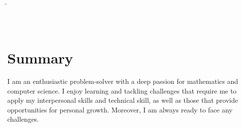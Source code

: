 \documentclass[a4paper, oneside]{article}
\begin{document}
\fontsize{9}{10}\selectfont
\color{default}
\par\smallskip
\begin{minipage}[H][0.8cm][t]{\dimexpr\linewidth}
	\begin{tabbing}
		\hspace{10cm}\=\kill
		\> \\
		 \>  \\
		\> \\
	\end{tabbing}
\end{minipage}


\section{Summary}
I am an enthusiastic problem-solver with a deep passion for mathematics and computer science. I enjoy learning and tackling challenges that require me to apply my interpersonal skills and technical skill, as well as those that provide opportunities for personal growth. Moreover, I am always ready to face any challenges.
\end{document}
